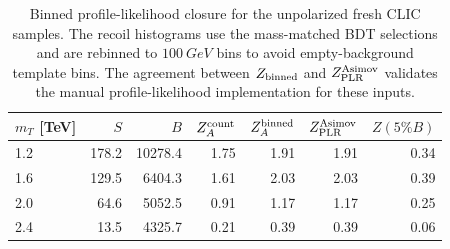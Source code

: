 \begin{table}[t]
\centering
\caption{Binned profile-likelihood closure for the unpolarized fresh CLIC
samples.  The recoil histograms use the mass-matched BDT selections and are
rebinned to $\SI{100}{GeV}$ bins to avoid empty-background template bins.  The
agreement between $Z_{\rm binned}$ and $Z_{\rm PLR}^{\rm Asimov}$ validates the
manual profile-likelihood implementation for these inputs.}
\label{tab:fresh-clic-profile}
\small
\begin{tabular}{lrrrrrr}
\toprule
$m_T$ [TeV] & $S$ & $B$ & $Z_A^{\rm count}$ & $Z_A^{\rm binned}$ & $Z_{\rm PLR}^{\rm Asimov}$ & $Z(5\%B)$ \\
\midrule
    1.2 & 178.2 & 10278.4 & 1.75 & 1.91 & 1.91 & 0.34 \\
    1.6 & 129.5 & 6404.3 & 1.61 & 2.03 & 2.03 & 0.39 \\
    2.0 & 64.6 & 5052.5 & 0.91 & 1.17 & 1.17 & 0.25 \\
    2.4 & 13.5 & 4325.7 & 0.21 & 0.39 & 0.39 & 0.06 \\
\bottomrule
\end{tabular}
\end{table}
